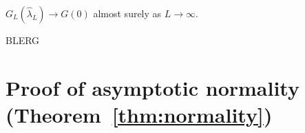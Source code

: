 \documentclass[journal]{IEEEtran}
\begin{document}

\begin{lemma}\label{lem:GLtoG0}
$G_L(\hat{\lambda}_L) \rightarrow G(0)$ almost surely as $L \rightarrow \infty$.
\end{lemma}
\begin{IEEEproof}
BLERG
\end{IEEEproof}
 

\section{Proof of asymptotic normality (Theorem~\ref{thm:normality}) } \label{sec:proof-asympt-norm}
\end{document}
